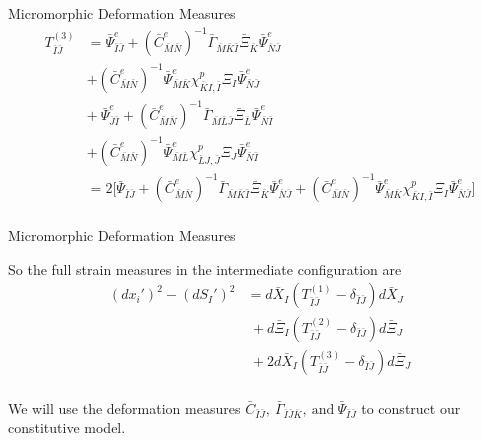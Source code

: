 \documentclass[11pt]{beamer}
\begin{document}
\begin{frame}{Micromorphic Deformation Measures}
\begin{align*}
T_{\bar{I}\bar{J}}^{(3)}&= \bar{\Psi}_{\bar{I}\bar{J}}^e  + \left(\bar{C}_{\bar{M}\bar{N}}^e\right)^{-1} \bar{\Gamma}_{\bar{M}\bar{K}\bar{I}} \bar{\Xi}_{\bar{K}} \bar{\Psi}_{\bar{N}\bar{J}}^e\\
& + \left(\bar{C}_{\bar{M}\bar{N}}^e\right)^{-1} \bar{\Psi}_{\bar{M}\bar{K}}^e \chi_{\bar{K}I,\bar{I}}^p \Xi_{I} \bar{\Psi}_{\bar{N}\bar{J}}^e\\
&+\ \bar{\Psi}_{\bar{J}\bar{I}}^e + \left(\bar{C}_{\bar{M}\bar{N}}^e\right)^{-1} \bar{\Gamma}_{\bar{M}\bar{L}\bar{J}} \bar{\Xi}_{\bar{L}} \bar{\Psi}_{\bar{N}\bar{I}}^e\\
& + \left(\bar{C}_{\bar{M}\bar{N}}^e\right)^{-1} \bar{\Psi}_{\bar{M}\bar{L}}^e \chi_{\bar{L}J,\bar{J}}^p \Xi_{J} \bar{\Psi}_{\bar{N}\bar{I}}^e\\
&= 2\bigg[\bar{\Psi}_{\bar{I}\bar{J}} + \left(\bar{C}_{\bar{M}\bar{N}}^e\right)^{-1} \bar{\Gamma}_{\bar{M}\bar{K}\bar{I}} \bar{\Xi}_{\bar{K}} \bar{\Psi}_{\bar{N}\bar{J}}^e + \left(\bar{C}_{\bar{M}\bar{N}}^e\right)^{-1} \bar{\Psi}_{\bar{M}\bar{K}}^e \chi_{\bar{K}I,\bar{I}}^p \Xi_{I} \bar{\Psi}_{\bar{N}\bar{J}}^e\bigg]\\
\end{align*}
\end{frame}

\begin{frame}{Micromorphic Deformation Measures}

So the full strain measures in the intermediate configuration are
\begin{align*}
\left(dx_i'\right)^2 - \left(dS_I'\right)^2 &= d\bar{X}_{I} \left(T_{\bar{I}\bar{J}}^{(1)} - \delta_{\bar{I}\bar{J}}\right) d\bar{X}_{J}\\
&\ + d\bar{\Xi}_{I} \left(T_{\bar{I}\bar{J}}^{(2)} - \delta_{\bar{I}\bar{J}}\right) d\bar{\Xi}_{J}\\
&\ + 2d\bar{X}_{I}\left(T_{\bar{I}\bar{J}}^{(3)} - \delta_{\bar{I}\bar{J}}\right) d\bar{\Xi}_{J}\\
\end{align*}

We will use the deformation measures $\bar{C}_{\bar{I}\bar{J}},\ \bar{\Gamma}_{\bar{I}\bar{J}\bar{K}},\ \text{and}\ \bar{\Psi}_{\bar{I}\bar{J}}$ to construct our constitutive model.

\end{frame}
\end{document}
